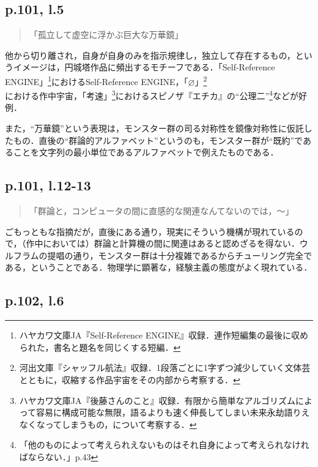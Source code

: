 \documentclass[10pt, a5paper, twoside]{jsarticle}
\theoremstyle{definition}
\begin{document}
		\subsection{p.101, l.5}

			\begin{quote}

				「孤立して虚空に浮かぶ巨大な万華鏡」
				
			\end{quote}

			他から切り離され，自身が自身のみを指示規律し，独立して存在するもの，というイメージは，円城塔作品に頻出するモチーフである．「Self-Reference ENGINE」\footnote{ハヤカワ文庫JA『Self-Reference ENGINE』収録．連作短編集の最後に収められた，書名と題名を同じくする短編．}におけるSelf-Reference ENGINE，「$\varnothing$」\footnote{河出文庫『シャッフル航法』収録．1段落ごとに1字ずつ減少していく文体芸とともに，収縮する作品宇宙をその内部から考察する．}における作中宇宙，「考速」\footnote{ハヤカワ文庫JA『後藤さんのこと』収録．有限から簡単なアルゴリズムによって容易に構成可能な無限，語るよりも速く伸長してしまい未来永劫語りえなくなってしまうもの，について考察する．}におけるスピノザ『エチカ』の“公理二”\footnote{「他のものによって考えられえないものはそれ自身によって考えられなければならない．」\cite{ethica}p.43}などが好例．

			また，“万華鏡”という表現は，モンスター群の司る対称性を鏡像対称性に仮託したもの．直後の“群論的アルファベット”というのも，モンスター群が“既約”であることを文字列の最小単位であるアルファベットで例えたものである．

		\subsection{p.101, l.12-13}

			\begin{quote}

				「群論と，コンピュータの間に直感的な関連なんてないのでは，〜」
				
			\end{quote}

			ごもっともな指摘だが，直後にある通り，現実にそういう機構が現れているので，（作中においては）群論と計算機の間に関連はあると認めざるを得ない．ウルフラムの提唱の通り，モンスター群は十分複雑であるからチューリング完全である，ということである．物理学に顕著な，経験主義の態度がよく現れている．

		\subsection{p.102, l.6}
\end{document}
